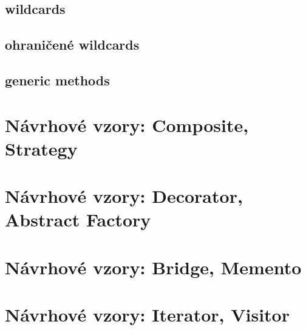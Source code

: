 \subsection{wildcards}
\subsection{ohraničené wildcards}
\subsection{generic methods}

\section{Návrhové vzory: Composite, Strategy}

\section{Návrhové vzory: Decorator, Abstract Factory}

\section{Návrhové vzory: Bridge, Memento}

\section{Návrhové vzory: Iterator, Visitor}


